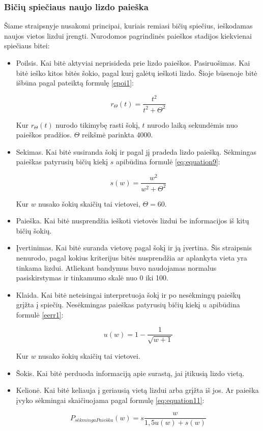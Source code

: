 \documentclass{VUMIFKompMagistrinis}
\begin{document}
\subsubsection{Bičių spiečiaus naujo lizdo paieška}

Šiame straipsnyje \cite{JMB06} nusakomi principai, kuriais remiasi bičių spiečius, ieškodamas naujos vietos lizdui įrengti. Nurodomos pagrindinės paieškos stadijos kiekvienai spiečiaus bitei:
\begin{itemize}
    \item 
	Poilsis. Kai bitė aktyviai neprisideda prie lizdo paieškos.
	Pasiruošimas. Kai bitė ieško kitos bitės šokio, pagal kurį galėtų ieškoti lizdo. Šioje būsenoje bitė išbūna pagal pateiktą formulę \eqref{epoi1}:

\begin{equation}\label{epoi1}
    r_{\Theta}(t)= \frac{t^2}{t^2+\Theta^2}
\end{equation}

Kur $r_{\Theta}(t)$ nurodo tikimybę rasti šokį, $t$ nurodo laiką sekundėmis nuo paieškos pradžios. $\Theta$ reikšmė parinkta 4000.
\item 
	Sekimas. Kai bitė susiranda šokį ir pagal jį pradeda lizdo paiešką.  Sėkmingas paieškas patyrusių bičių kiekį $s$ apibūdina formulė \eqref{eq:equation9}:
	
\begin{equation}
    \label{eq:equation9}
    s(w)=\frac{w^2}{w^2+\Theta ^2}    
\end{equation}

Kur $w$ nusako šokių skaičių tai vietovei, $\Theta=60$.
\item 
	Paieška. Kai bitė nusprendžia ieškoti vietovės lizdui be informacijos iš kitų bičių šokių.
\item 	
Įvertinimas. Kai bitė suranda vietovę pagal šokį ir ją įvertina. Šis straipsnis nenurodo, pagal kokius kriterijus bitės nusprendžia ar aplankyta vieta yra tinkama lizdui. Atliekant bandymus buvo naudojamas normalus pasiskirstymas ir tinkamumo skalė nuo 0 iki 100.
\item 
	Klaida. Kai bitė neteisingai interpretuoja šokį ir po nesėkmingų paieškų grįžta į spiečių. Nesėkmingas paieškas patyrusių bičių kiekį $u$ apibūdina formulė \eqref{eerr1}:

\begin{equation}
\label{eerr1}
    u(w)=1-\frac{1}{\sqrt{w+1}}
\end{equation}

Kur $w$ nusako šokių skaičių tai vietovei.
	
\item 	
	Šokis. Kai bitė perduoda informaciją apie surastą, jai įtikusią lizdo vietą.
\item 		
Kelionė. Kai bitė keliauja į geriausią vietą lizdui arba grįžta iš jos. Ar paieška įvyko sėkmingai skaičiuojama pagal formulę \eqref{eq:equation11}:

\begin{equation}
    \label{eq:equation11}
    P_{s\textit{\.e}kmingaPaie\textit{\v{s}}ka}(w) = s\frac{w}{1,5 u(w)+s(w)}    
\end{equation}

\end{itemize}
\end{document}
